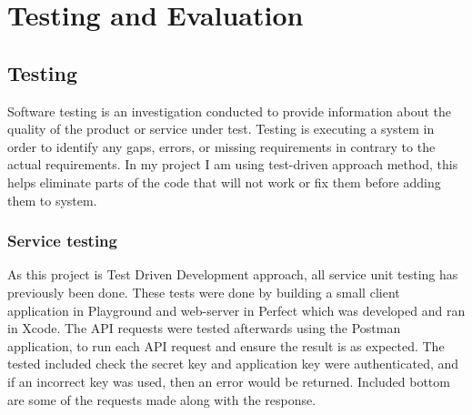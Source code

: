 \chapter{Testing and Evaluation}

\section{Testing}

Software testing is an investigation conducted to provide information about the quality of the product or service under test. Testing is executing a system in order to identify any gaps, errors, or missing requirements in contrary to the actual requirements. In my project I am using test-driven approach method, this helps eliminate parts of the code that will not work or fix them before adding them to system.

\subsection{Service testing}

As this project is Test Driven Development approach, all service unit testing has previously been done. These tests were done by building a small client application in Playground and web-server in Perfect which was developed and ran in Xcode. The API requests were tested afterwards using the Postman application, to run each API request and ensure the result is as expected. The tested included check the secret key and application key were authenticated, and if an incorrect key was used, then an error would be returned. Included bottom are some of the requests made along with the response.


